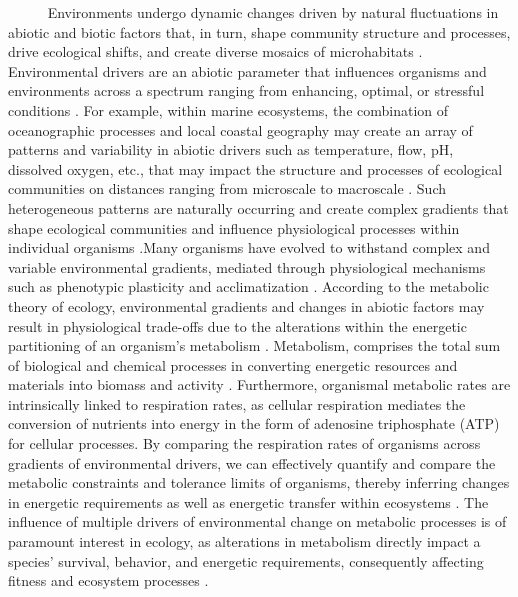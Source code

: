 \documentclass[
  12pt,
]{article}
\begin{document}
~~~~~ Environments undergo dynamic changes driven by natural
fluctuations in abiotic and biotic factors that, in turn, shape
community structure and processes, drive ecological shifts, and create
diverse mosaics of microhabitats
\citep{connell1961influence, stenseth2002ecological, kroeker2017embracing}.
Environmental drivers are an abiotic parameter that influences organisms
and environments across a spectrum ranging from enhancing, optimal, or
stressful conditions
\citep{cote2016interactions, boyd2012understanding}. For example, within
marine ecosystems, the combination of oceanographic processes and local
coastal geography may create an array of patterns and variability in
abiotic drivers such as temperature, flow, pH, dissolved oxygen, etc.,
that may impact the structure and processes of ecological communities on
distances ranging from microscale to macroscale
\citep{deser2010sea, hofmann2010living}. Such heterogeneous patterns are
naturally occurring and create complex gradients that shape ecological
communities and influence physiological processes within individual
organisms \citep{helmuth2006mosaic}.Many organisms have evolved to
withstand complex and variable environmental gradients, mediated through
physiological mechanisms such as phenotypic plasticity and
acclimatization \citep{hofmann2010living, tomanek2002heat}. According to
the metabolic theory of ecology, environmental gradients and changes in
abiotic factors may result in physiological trade-offs due to the
alterations within the energetic partitioning of an organism's
metabolism \citep{portner2008physiology, brown2004metabolic}.
Metabolism, comprises the total sum of biological and chemical processes
in converting energetic resources and materials into biomass and
activity \citep{brown2004metabolic}. Furthermore, organismal metabolic
rates are intrinsically linked to respiration rates, as cellular
respiration mediates the conversion of nutrients into energy in the form
of adenosine triphosphate (ATP) for cellular processes. By comparing the
respiration rates of organisms across gradients of environmental
drivers, we can effectively quantify and compare the metabolic
constraints and tolerance limits of organisms, thereby inferring changes
in energetic requirements as well as energetic transfer within
ecosystems \citep{somero2002thermal, silbiger2019comparative}. The
influence of multiple drivers of environmental change on metabolic
processes is of paramount interest in ecology, as alterations in
metabolism directly impact a species' survival, behavior, and energetic
requirements, consequently affecting fitness and ecosystem processes
\citep{carey2016sea}.
\end{document}
